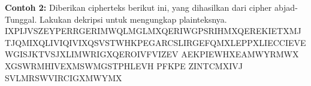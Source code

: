 \documentclass{article}
\begin{document}

\textbf{Contoh 2:} Diberikan cipherteks berikut ini, yang dihasilkan dari cipher abjad-Tunggal. Lakukan dekripsi untuk mengungkap plainteksnya.\\
\nLIVITCSWPIYVEWHEVSRIQMXLEYVEOIEWHRXEXIPFEMVEWHKVSTYLXZIX\nLIKI IXPIJVSZEYPERRGERIMWQLMGLMXQERIWGPSRIHMXQEREKIETXMJT\nPRGEVEKEITREWHEXXLEXXMZITWAWSQWXSWEXTVEPMRXRSJGSTVRIEYVI\nEXCVUMIWERGMIWXMJMGCSMWXSW JQMIXQLIVIQIVIXQSVSTWHKPEGARCS\nXRWIEWSWIIBXVIZMXFSJXLIKEGAEWHEPSWYSWIWIEVXLISXLIVLX LIRGE\nPIRQIVIIBGIIHMWYPFLEVHEWHYPSRR FQMXLEPPXLIECCIEVEWGISJKTV\nWMRLIHYSPHXLIQIMYLX SJXLIMWRIGXQEROIVFVIZEV AEKPIEWHXEAMWY\nEPPXLMWY RMWX XGSWRMHIVEXMSWMGSTPHLEVH PFKPE ZINTCMXIVJ SVLMR\nSCMWM SWVIRCIGXMWYMX
\end{document}
